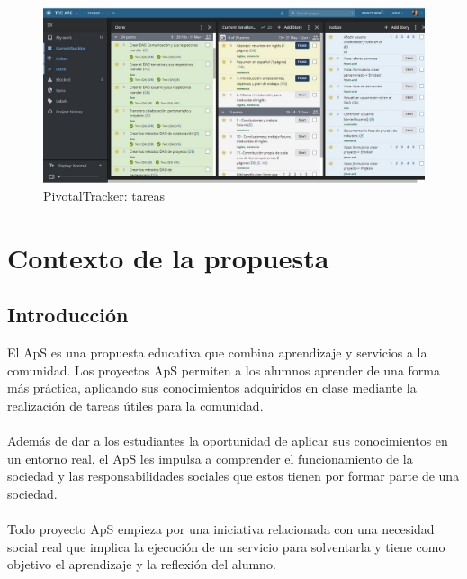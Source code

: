 \documentclass[11pt]{book}
\begin{document}
\begin{figure}[t]
	\centering
	\includegraphics[scale=0.44]{pivotal2}
	\caption{PivotalTracker: tareas}
	\label{fig:pivotal2}
\end{figure}
\chapter{Contexto de la propuesta}\label{cap:contexto}
\section{Introducción}
El ApS es una propuesta educativa que combina aprendizaje y servicios a la comunidad. Los proyectos  ApS permiten a los alumnos aprender de una forma más práctica, aplicando sus conocimientos adquiridos en clase mediante la realización de tareas útiles para la comunidad. \\\\
Además de dar a los estudiantes la oportunidad de aplicar sus conocimientos en un entorno real, el ApS les impulsa a comprender el funcionamiento de la sociedad y las responsabilidades sociales que estos tienen por formar parte de una sociedad.\\\\
Todo proyecto ApS empieza por una iniciativa relacionada con una necesidad social real que implica la ejecución de un servicio para solventarla y tiene como objetivo el aprendizaje y la reflexión del alumno.
\end{document}
